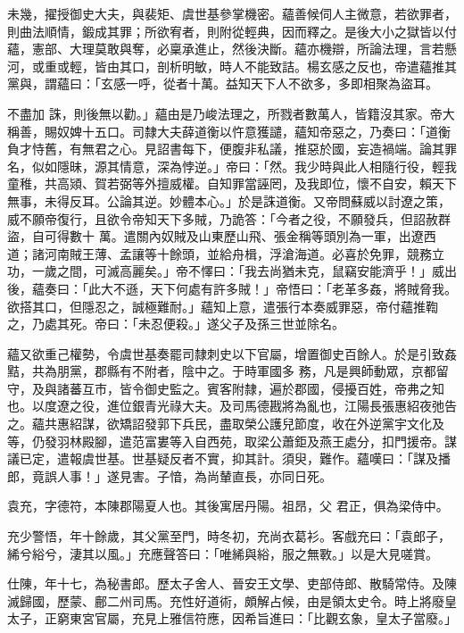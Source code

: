 \begin{pinyinscope}
 未幾，擢授御史大夫，與裴矩、虞世基參掌機密。蘊善候伺人主微意，若欲罪者，則曲法順情，鍛成其罪；所欲宥者，則附從輕典，因而釋之。是後大小之獄皆以付蘊，憲部、大理莫敢與奪，必稟承進止，然後決斷。蘊亦機辯，所論法理，言若懸河，或重或輕，皆由其口，剖析明敏，時人不能致詰。楊玄感之反也，帝遣蘊推其黨與，謂蘊曰：「玄感一呼，從者十萬。益知天下人不欲多，多即相聚為盜耳。



 不盡加
 誅，則後無以勸。」蘊由是乃峻法理之，所戮者數萬人，皆籍沒其家。帝大稱善，賜奴婢十五口。司隸大夫薛道衡以忤意獲譴，蘊知帝惡之，乃奏曰：「道衡負才恃舊，有無君之心。見詔書每下，便腹非私議，推惡於國，妄造禍端。論其罪名，似如隱昧，源其情意，深為悖逆。」帝曰：「然。我少時與此人相隨行役，輕我童稚，共高熲、賀若弼等外擅威權。自知罪當誣罔，及我即位，懷不自安，賴天下無事，未得反耳。公論其逆。妙體本心。」於是誅道衡。又帝問蘇威以討遼之策，威不願帝復行，且欲令帝知天下多賊，乃詭答：「今者之役，不願發兵，但詔赦群盜，自可得數十
 萬。遣關內奴賊及山東歷山飛、張金稱等頭別為一軍，出遼西道；諸河南賊王薄、孟讓等十餘頭，並給舟楫，浮滄海道。必喜於免罪，競務立功，一歲之間，可滅高麗矣。」帝不懌曰：「我去尚猶未克，鼠竊安能濟乎！」威出後，蘊奏曰：「此大不遜，天下何處有許多賊！」帝悟曰：「老革多姦，將賊脅我。欲搭其口，但隱忍之，誠極難耐。」蘊知上意，遣張行本奏威罪惡，帝付蘊推鞫之，乃處其死。帝曰：「未忍便殺。」遂父子及孫三世並除名。



 蘊又欲重己權勢，令虞世基奏罷司隸刺史以下官屬，增置御史百餘人。於是引致姦黠，共為朋黨，郡縣有不附者，陰中之。于時軍國多
 務，凡是興師動眾，京都留守，及與諸蕃互市，皆令御史監之。賓客附隸，遍於郡國，侵擾百姓，帝弗之知也。以度遼之役，進位銀青光祿大夫。及司馬德戡將為亂也，江陽長張惠紹夜弛告之。蘊共惠紹謀，欲矯詔發郭下兵民，盡取榮公護兒節度，收在外逆黨宇文化及等，仍發羽林殿腳，遣范富婁等入自西苑，取梁公蕭鉅及燕王處分，扣門援帝。謀議已定，遣報虞世基。世基疑反者不實，抑其計。須臾，難作。蘊嘆曰：「謀及播郎，竟誤人事！」遂見害。子愔，為尚輦直長，亦同日死。



 袁充，字德符，本陳郡陽夏人也。其後寓居丹陽。祖昂，父
 君正，俱為梁侍中。



 充少警悟，年十餘歲，其父黨至門，時冬初，充尚衣葛衫。客戲充曰：「袁郎子，絺兮綌兮，淒其以風。」充應聲答曰：「唯絺與綌，服之無斁。」以是大見嗟賞。



 仕陳，年十七，為秘書郎。歷太子舍人、晉安王文學、吏部侍郎、散騎常侍。及陳滅歸國，歷蒙、鄜二州司馬。充性好道術，頗解占候，由是領太史令。時上將廢皇太子，正窮東宮官屬，充見上雅信符應，因希旨進曰：「比觀玄象，皇太子當廢。」




\end{pinyinscope}
